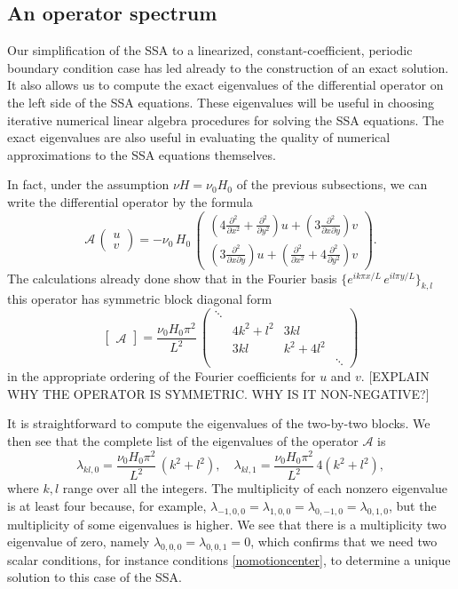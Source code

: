 \documentclass[12pt]{amsart}%
\theoremstyle{plain}
\theoremstyle{definition}
\newcommand{\ddxx}[1]{\ensuremath{\frac{\partial^2 #1}{\partial x^2}}}
\newcommand{\ddyy}[1]{\ensuremath{\frac{\partial^2 #1}{\partial y^2}}}
\newcommand{\ddxy}[1]{\ensuremath{\frac{\partial^2 #1}{\partial x \partial y}}}
\begin{document}
\subsection{An operator spectrum}  Our simplification of the SSA to a linearized, constant-coefficient, periodic boundary condition case has led already to the construction of an exact solution.  It also allows us to compute the exact eigenvalues of the differential operator on the left side of the SSA equations.  These eigenvalues will be useful in choosing iterative numerical linear algebra procedures for solving the SSA equations.  The exact eigenvalues are also useful in evaluating the quality of numerical approximations to the SSA equations themselves.

In fact, under the assumption $\nu H = \nu_0 H_0$ of the previous subsections, we can write the differential operator by the formula
	$$\mathcal{A}\,\begin{pmatrix} u \\ v \end{pmatrix} = - \nu_0\,H_0\,\begin{pmatrix} \left(4\ddxx{} + \ddyy{}\right) u + \left(3 \ddxy{}\right) v \\ \left(3 \ddxy{}\right) u + \left(\ddxx{} + 4\ddyy{}\right) v \end{pmatrix}.$$
The calculations already done show that in the Fourier basis $\{e^{ik\pi x/L}\, e^{il\pi y/L}\}_{k,l}$ this operator has symmetric block diagonal form
	$$\begin{bmatrix} \mathcal{A} \end{bmatrix} = \frac{\nu_0 H_0 \pi^2}{L^2}\,
            \begin{pmatrix} \ddots &            &            &        \\
                                   & 4k^2 + l^2 & 3kl        &        \\
                                   & 3kl        & k^2 + 4l^2 &        \\
                                   &            &            & \ddots \end{pmatrix}$$
in the appropriate ordering of the Fourier coefficients for $u$ and $v$.  [EXPLAIN WHY THE OPERATOR IS SYMMETRIC.  WHY IS IT NON-NEGATIVE?]

It is straightforward to compute the eigenvalues of the two-by-two blocks.  We then see that the complete list of the eigenvalues of the operator $\mathcal{A}$ is
	$$\lambda_{kl,0} = \frac{\nu_0 H_0 \pi^2}{L^2}\, (k^2+l^2), \quad \lambda_{kl,1} = \frac{\nu_0 H_0 \pi^2}{L^2}\, 4 (k^2 + l^2),$$
where $k,l$ range over all the integers.  The multiplicity of each nonzero eigenvalue is at least four because, for example, $\lambda_{-1,0,0} = \lambda_{1,0,0} = \lambda_{0,-1,0} = \lambda_{0,1,0}$, but the multiplicity of some eigenvalues is higher.  We see that there is a multiplicity two eigenvalue of zero, namely $\lambda_{0,0,0} = \lambda_{0,0,1} = 0$, which confirms that we need two scalar conditions, for instance conditions \eqref{nomotioncenter}, to determine a unique solution to this case of the SSA.
\end{document}
